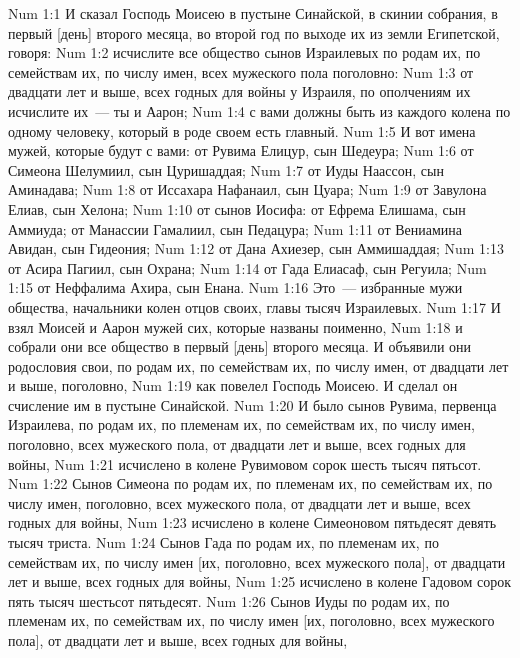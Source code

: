 \vs Num 1:1 И сказал Господь Моисею в пустыне Синайской, в скинии собрания, в первый [день] второго месяца, во второй год по выходе их из земли Египетской, говоря:
\vs Num 1:2 исчислите все общество сынов Израилевых по родам их, по семействам их, по числу имен, всех мужеского пола поголовно:
\vs Num 1:3 от двадцати лет и выше, всех годных для войны у Израиля, по ополчениям их исчислите их~--- ты и Аарон;
\vs Num 1:4 с вами должны быть из каждого колена по одному человеку, который в роде своем есть главный.
\vs Num 1:5 И вот имена мужей, которые будут с вами: от Рувима Елицур, сын Шедеура;
\vs Num 1:6 от Симеона Шелумиил, сын Цуришаддая;
\vs Num 1:7 от Иуды Наассон, сын Аминадава;
\vs Num 1:8 от Иссахара Нафанаил, сын Цуара;
\vs Num 1:9 от Завулона Елиав, сын Хелона;
\vs Num 1:10 от сынов Иосифа: от Ефрема Елишама, сын Аммиуда; от Манассии Гамалиил, сын Педацура;
\vs Num 1:11 от Вениамина Авидан, сын Гидеония;
\vs Num 1:12 от Дана Ахиезер, сын Аммишаддая;
\vs Num 1:13 от Асира Пагиил, сын Охрана;
\vs Num 1:14 от Гада Елиасаф, сын Регуила;
\vs Num 1:15 от Неффалима Ахира, сын Енана.
\vs Num 1:16 Это~--- избранные мужи общества, начальники колен отцов своих, главы тысяч Израилевых.
\rsbpar\vs Num 1:17 И взял Моисей и Аарон мужей сих, которые названы поименно,
\vs Num 1:18 и собрали они все общество в первый [день] второго месяца. И объявили они родословия свои, по родам их, по семействам их, по числу имен, от двадцати лет и выше, поголовно,
\vs Num 1:19 как повелел Господь Моисею. И сделал он счисление им в пустыне Синайской.
\vs Num 1:20 И было сынов Рувима, первенца Израилева, по родам их, по племенам их, по семействам их, по числу имен, поголовно, всех мужеского пола, от двадцати лет и выше, всех годных для войны,
\vs Num 1:21 исчислено в колене Рувимовом сорок шесть тысяч пятьсот.
\vs Num 1:22 Сынов Симеона по родам их, по племенам их, по семействам их, по числу имен, поголовно, всех мужеского пола, от двадцати лет и выше, всех годных для войны,
\vs Num 1:23 исчислено в колене Симеоновом пятьдесят девять тысяч триста.
\vs Num 1:24 Сынов Гада по родам их, по племенам их, по семействам их, по числу имен [их, поголовно, всех мужеского пола], от двадцати лет и выше, всех годных для войны,
\vs Num 1:25 исчислено в колене Гадовом сорок пять тысяч шестьсот пятьдесят.
\vs Num 1:26 Сынов Иуды по родам их, по племенам их, по семействам их, по числу имен [их, поголовно, всех мужеского пола], от двадцати лет и выше, всех годных для войны,
